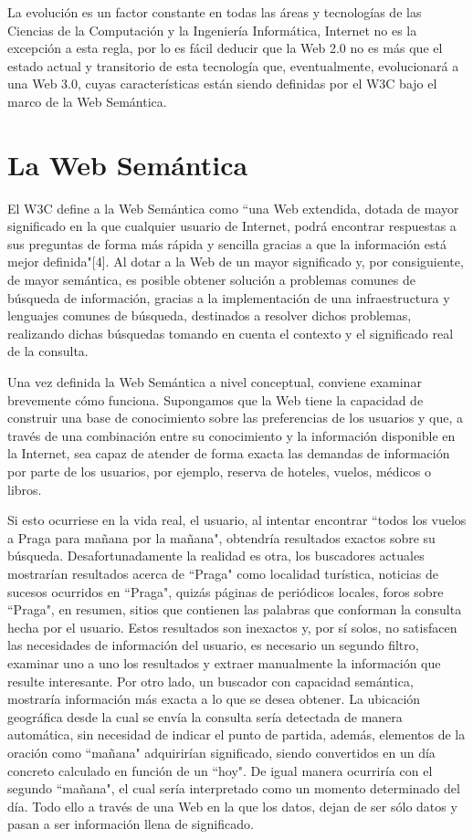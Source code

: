 La evolución es un factor constante en todas las áreas y tecnologías de las Ciencias de la Computación y la Ingeniería Informática, Internet no es la excepción a esta regla, por lo es fácil deducir que la Web 2.0 no es más que el estado actual y transitorio de esta tecnología que, eventualmente, evolucionará a una Web 3.0, cuyas características están siendo definidas por el W3C bajo el marco de la Web Semántica.

\section{La Web Semántica}

El W3C define a la Web Semántica como ``una Web extendida, dotada de mayor significado en la que cualquier usuario de Internet, podrá encontrar respuestas a sus preguntas de forma más rápida y sencilla gracias a que la información está mejor definida"[4]. Al dotar a la Web de un mayor significado y, por consiguiente, de mayor semántica, es posible obtener solución a problemas comunes de búsqueda de información, gracias a la implementación de una infraestructura y lenguajes comunes de búsqueda, destinados a resolver dichos problemas, realizando dichas búsquedas tomando en cuenta el contexto y el significado real de la consulta.

Una vez definida la Web Semántica a nivel conceptual, conviene examinar brevemente cómo funciona. Supongamos que la Web tiene la capacidad de construir una base de conocimiento sobre las preferencias de los usuarios y que, a través de una combinación entre su conocimiento y la información disponible en la Internet, sea capaz de atender de forma exacta las demandas de información por parte de los usuarios, por ejemplo, reserva de hoteles, vuelos, médicos o libros.

Si esto ocurriese en la vida real, el usuario, al intentar encontrar ``todos los vuelos a Praga para mañana por la mañana", obtendría resultados exactos sobre su búsqueda. Desafortunadamente la realidad es otra, los buscadores actuales mostrarían resultados acerca de ``Praga" como localidad turística, noticias de sucesos ocurridos en ``Praga", quizás páginas de periódicos locales, foros sobre ``Praga", en resumen, sitios que contienen las palabras que conforman la consulta hecha por el usuario. Estos resultados son inexactos y, por sí solos, no satisfacen las necesidades de información del usuario, es necesario un segundo filtro, examinar uno a uno los resultados y extraer manualmente la información que resulte interesante. Por otro lado, un buscador con capacidad semántica, mostraría información más exacta a lo que se desea obtener. La ubicación geográfica desde la cual se envía la consulta sería detectada de manera automática, sin necesidad de indicar el punto de partida, además, elementos de la oración como ``mañana" adquirirían significado, siendo convertidos en un día concreto calculado en función de un ``hoy". De igual manera ocurriría con el segundo ``mañana", el cual sería interpretado como un momento determinado del día. Todo ello a través de una Web en la que los datos, dejan de ser sólo datos y pasan a ser información llena de significado.

